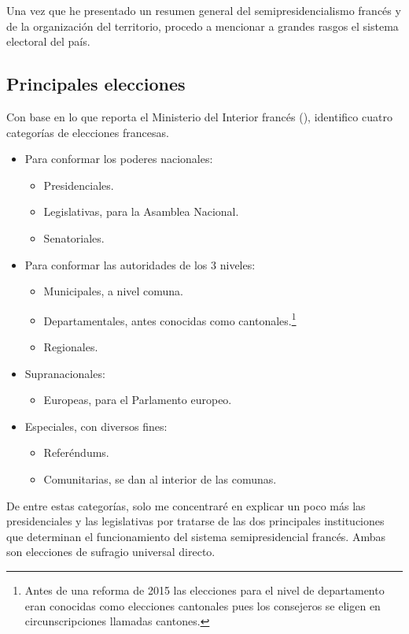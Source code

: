 Una vez que he presentado un resumen general del semipresidencialismo francés y de la organización del territorio, procedo a mencionar a grandes rasgos el sistema electoral del país.

\subsection{Principales elecciones}

Con base en lo que reporta el Ministerio del Interior francés (), identifico cuatro categorías de elecciones francesas. 

\begin{itemize}
\item Para conformar los poderes nacionales: 
	\begin{itemize}
	\item Presidenciales. 
	\item Legislativas, para la Asamblea Nacional.
	\item Senatoriales.
	\end{itemize}
	
\item Para conformar las autoridades de los 3 niveles: 
	\begin{itemize}
	\item Municipales, a nivel comuna. 
	\item Departamentales, antes conocidas como cantonales.\footnote{Antes de una reforma de 2015 las elecciones para el nivel de departamento eran conocidas como elecciones cantonales pues los consejeros se eligen en circunscripciones llamadas cantones.}
	\item Regionales.
	\end{itemize}
	
\item Supranacionales:
	\begin{itemize}
	\item Europeas, para el Parlamento europeo.
	\end{itemize}
	
\item Especiales, con diversos fines: 
	\begin{itemize}
	\item Referéndums.
	\item Comunitarias, se dan al interior de las comunas.
	\end{itemize}
\end{itemize}

De entre estas categorías, solo me concentraré en explicar un poco más las presidenciales y las legislativas por tratarse de las dos principales instituciones que determinan el funcionamiento del sistema semipresidencial francés. Ambas son elecciones de sufragio universal directo.\\

